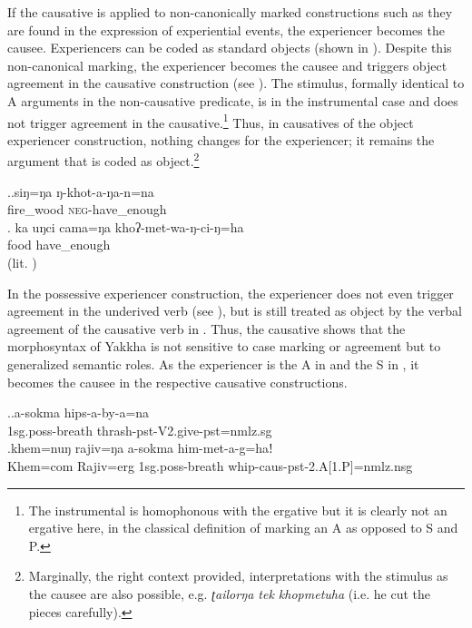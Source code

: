 If the causative is applied to non-canonically marked constructions such as they are found in the expression of experiential events, the experiencer  becomes the causee. Experiencers can be coded as standard objects (shown in \Next[a]). Despite this non-canonical marking, the experiencer becomes the causee and triggers object agreement in the causative construction (see \Next[b]). The stimulus, formally identical to A arguments in the non-causative predicate, is in the instrumental case and does not trigger agreement in the causative.\footnote{The instrumental is homophonous with the ergative but it is clearly not an ergative here, in the classical definition of marking an A as opposed to S and P.} Thus, in causatives of the object experiencer construction, nothing changes for the experiencer; it remains the argument that is coded as object.\footnote{Marginally, the right context provided, interpretations with the stimulus as the causee are also possible, e.g. \emph{ʈailorŋa tek khopmetuha}  (i.e. he cut the pieces carefully).} 

\ex.\ag.siŋ=ŋa ŋ-khot-a-ŋa-n=na\\
	fire\_wood \textsc{neg}-have\_enough\\
	\bg. ka uŋci cama=ŋa khoʔ-met-wa-ŋ-ci-ŋ=ha\\
	  food	have\_enough\\
		 (lit. )

		
In the possessive experiencer construction, the experiencer does not even trigger agreement in the underived verb (see \Next[a]), but is still treated as object by the verbal agreement of the causative verb in \Next[b]. Thus, the causative shows that the morphosyntax of Yakkha is not sensitive to case marking or agreement but to generalized semantic roles. As the experiencer is the A in \Last and the S in \Next, it becomes the causee in the respective causative constructions. 

	\ex.\ag.a-sokma hips-a-by-a=na\\
	{\sc 1sg.poss-}breath thrash{\sc [3sg]-pst-V2.give-pst=nmlz.sg}\\	
	 \bg.khem=nuŋ rajiv=ŋa a-sokma him-met-a-g=haǃ\\
	Khem{\sc =com}  Rajiv{\sc =erg} {\sc 1sg.poss-}breath whip{\sc -caus-pst-2.A[1.P]=nmlz.nsg}\\


